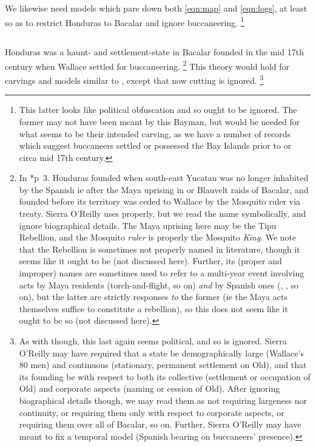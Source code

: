 		We likewise need models which pare down both \ref{eqn:map} and \ref{eqn:logs}, at least so as to restrict Honduras to Bacalar and ignore buccaneering.%
		\footnote{This latter looks like political obfuscation and so ought to be ignored. The former may not have been meant by this Bayman, but would be needed for what seems to be their intended carving, as we have a number of records which suggest buccaneers settled or possessed the Bay Islands prior to or circa mid 17th century.} %
	\subsection{}
	\label{ss:fenix}
		Honduras was a haunt- and settlement-state in Bacalar founded in the mid 17th century when Wallace settled for buccaneering.%
		\footnote{In \cite{fen49}*{p~3}. Honduras founded when south-east Yucatan was no longer inhabited by the Spanish ie after the Maya uprising in or Blauvelt raids of Bacalar, and founded before its territory was ceded to Wallace by the Mosquito ruler via treaty. Sierra O'Reilly uses  properly, but we read the name symbolically, and ignore biographical details. The Maya uprising here may be the Tipu Rebellion, and the Mosquito \emph{ruler} is properly the Mosquito \emph{King}. We note that the Rebellion is sometimes not properly named in literature, though it seems like it ought to be (not discussed here). Further, its (proper and improper) names are sometimes used to refer to a multi-year event involving acts by Maya residents (torch-and-flight, so on) \emph{and} by Spanish ones (, , so on), but the latter are strictly responses \emph{to} the former (ie the Maya acts themselves suffice to constitute a rebellion), so this does not seem like it ought to be so (not discussed here).} %
		This theory would hold for carvings and models similar to , except that now cutting is ignored.%
		\footnote{As with  though, this last again seems political, and so is ignored. Sierra O'Reilly may have required that a state be demographically large (Wallace's 80 men) and continuous (stationary, permanent settlement on Old), and that its founding be with respect to both its collective (settlement or occupation of Old) and corporate aspects (naming or cession of Old). After ignoring biographical details though, we may read them as not requiring largeness nor continuity, or requiring them only with respect to corporate aspects, or requiring them over all of Bacalar, so on. Further, Sierra O'Reilly may have meant to fix a temporal model (Spanish bearing on buccaneers' presence).}
